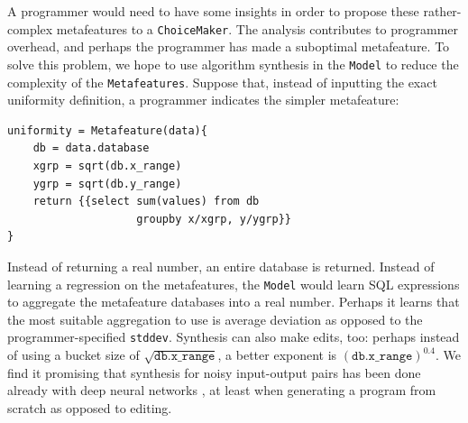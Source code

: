 \documentclass[11pt]{report}
\renewcommand{\t}[1]{\texttt{#1}}
\begin{document}
A programmer would need to have some insights in order to propose these rather-complex metafeatures to a \t{ChoiceMaker}. The analysis contributes to programmer overhead, and perhaps the programmer has made a suboptimal metafeature. To solve this problem, we hope to use algorithm synthesis in the \t{Model} to reduce the complexity of the \t{Metafeatures}. Suppose that, instead of inputting the exact uniformity definition, a programmer indicates the simpler metafeature:
\begin{lstlisting}[style=MyPythonStyle]
uniformity = Metafeature(data){
    db = data.database
    xgrp = sqrt(db.x_range)
    ygrp = sqrt(db.y_range)
    return {{select sum(values) from db 
                    groupby x/xgrp, y/ygrp}}
}
\end{lstlisting}
Instead of returning a real number, an entire database is returned. Instead of learning a regression on the metafeatures, the \t{Model} would learn SQL expressions to aggregate the metafeature databases into a real number. Perhaps it learns that the most suitable aggregation to use is average deviation as opposed to the programmer-specified \t{stddev}. Synthesis can also make edits, too: perhaps instead of using a bucket size of $\sqrt{\t{db.x\_range}}$, a better exponent is $(\t{db.x\_range})^{0.4}$. We find it promising that synthesis for noisy input-output pairs has been done already with deep neural networks \cite{Devlin:2017}, at least when generating a program from scratch as opposed to editing.
\end{document}
